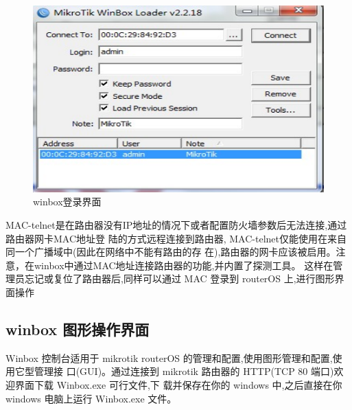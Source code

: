 \begin{figure}[h]
  \centering
  \includegraphics[width=.7\textwidth]{pic/winbox.png}
  \caption{winbox登录界面}
  \label{fig:winbox} 
\end{figure}

MAC-telnet是在路由器没有IP地址的情况下或者配置防火墙参数后无法连接,通过路由器网卡MAC地址登
陆的方式远程连接到路由器, MAC-telnet仅能使用在来自同一个广播域中(因此在网络中不能有路由的存
在),路由器的网卡应该被启用。注意，在winbox中通过MAC地址连接路由器的功能,并内置了探测工具。
这样在管理员忘记或复位了路由器后,同样可以通过 MAC 登录到 routerOS 上,进行图形界面操作

\subsection{winbox 图形操作界面}

Winbox 控制台适用于 mikrotik routerOS 的管理和配置,使用图形管理和配置,使用它型管理接
口(GUI)。通过连接到 mikrotik 路由器的 HTTP(TCP 80 端口)欢迎界面下载 Winbox.exe 可行文件,下
载并保存在你的 windows 中,之后直接在你windows 电脑上运行 Winbox.exe 文件。


